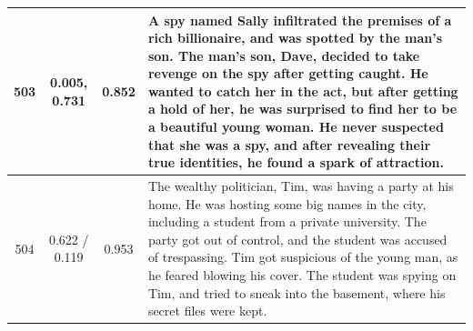 \begin{table}[ht]
\begin{center}
\begin{tabular}{cccp{8.5cm}}
    \midrule
    503 & 0.005, 0.731 & 0.852 & A spy named Sally infiltrated the premises of a rich billionaire, and was spotted by the man's son. The man's son, Dave, decided to take revenge on the spy after getting caught. He wanted to catch her in the act, but after getting a hold of her, he was surprised to find her to be a beautiful young woman. He never suspected that she was a spy, and after revealing their true identities, he found a spark of attraction. \\
    \midrule
    504 & 0.622 / 0.119 & 0.953 & The wealthy politician, Tim, was having a party at his home. He was hosting some big names in the city, including a student from a private university. The party got out of control, and the student was accused of trespassing. Tim got suspicious of the young man, as he feared blowing his cover. The student was spying on Tim, and tried to sneak into the basement, where his secret files were kept. \\
    \bottomrule
  \end{tabular}
  \end{center}
  \label{app:iter_stories_b2}
\end{table}

